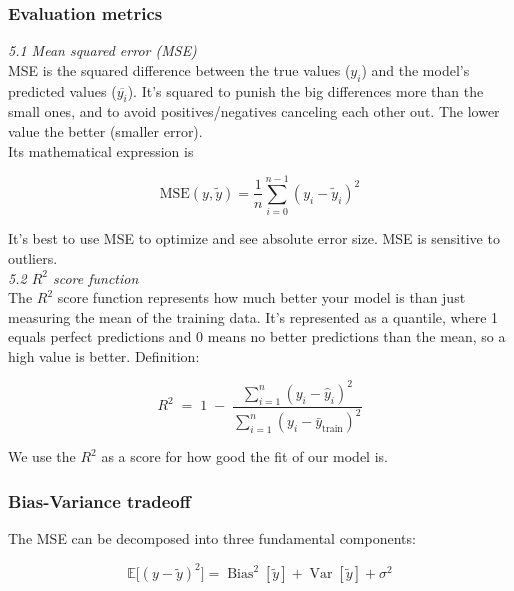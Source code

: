 \documentclass[amssymb,twocolumn,aps]{revtex4}
\begin{document}
\subsubsection{Evaluation metrics}

\textit{5.1 Mean squared error (MSE)} \\

MSE is the squared difference between the true values ($y_i$) and the model's predicted values ($\overline{y_i}$). It's squared to punish the big differences more than the small ones, and to avoid positives/negatives canceling each other out. The lower value the better (smaller error). \\

Its mathematical expression is 

\begin{equation}
    \text{MSE}(y, \tilde{y}) = \frac{1}{n} \sum_{i=0}^{n-1} (y_i - \tilde{y}_i)^2 
\end{equation}

It's best to use MSE to optimize and see absolute error size. MSE is sensitive to outliers. \\

\textit{5.2 $R^2$ score function} \\

The $R^2$ score function represents how much better your model is than just measuring the mean of the training data. It's represented as a quantile, where 1 equals perfect predictions and 0 means no better predictions than the mean, so a high value is better. Definition: 

\begin{equation}
    R^2 \;=\; 1 \;-\; \frac{\sum_{i=1}^n (y_i - \hat y_i)^2}{\sum_{i=1}^n (y_i - \bar y_{\text{train}})^2}
\end{equation}

We use the $R^2$ as a score for how good the fit of our model is. 

\subsubsection{Bias-Variance tradeoff}

The MSE can be decomposed into three fundamental components: 

\begin{equation}
    \mathbb{E}\!\big[(y-\tilde y)^2\big]
= \operatorname{Bias}^2[\tilde y]
+ \operatorname{Var}[\tilde y]
+ \sigma^2
\end{equation}
\end{document}
